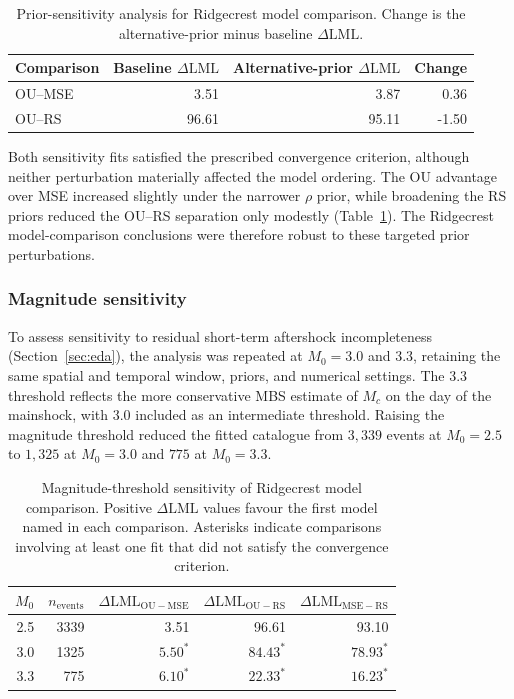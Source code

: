 \documentclass{statsmsc}
\begin{document}
\begin{table}[htbp]
\centering
\caption{Prior-sensitivity analysis for Ridgecrest model comparison. Change is the alternative-prior minus baseline $\Delta\mathrm{LML}$.}
\label{tab:ridgecrest-prior-sensitivity}
\begin{tabular}{lrrr}
\hline
Comparison & Baseline $\Delta\mathrm{LML}$ & Alternative-prior $\Delta\mathrm{LML}$ & Change \\
\hline
OU--MSE & 3.51 & 3.87 & 0.36 \\
OU--RS  & 96.61 & 95.11 & -1.50 \\
\hline
\end{tabular}
\end{table}

Both sensitivity fits satisfied the prescribed convergence criterion, although neither perturbation materially affected the model ordering. The OU advantage over MSE increased slightly under the narrower $\rho$ prior, while broadening the RS priors reduced the OU--RS separation only modestly (Table~\ref{tab:ridgecrest-prior-sensitivity}). The Ridgecrest model-comparison conclusions were therefore robust to these targeted prior perturbations.

\subsubsection{Magnitude sensitivity} \label{sec:mag-sensitivity}
To assess sensitivity to residual short-term aftershock incompleteness (Section~\ref{sec:eda}), the analysis was repeated at $M_0 = 3.0$ and $3.3$, retaining the same spatial and temporal window, priors, and numerical settings. The $3.3$ threshold reflects the more conservative MBS estimate of $M_c$ on the day of the mainshock, with $3.0$ included as an intermediate threshold. Raising the magnitude threshold reduced the fitted catalogue from $3{,}339$ events at $M_0 = 2.5$ to $1{,}325$ at $M_0 = 3.0$ and $775$ at $M_0=3.3$. 

\begin{table}[htbp]
\centering
\caption{Magnitude-threshold sensitivity of Ridgecrest model comparison. Positive $\Delta\mathrm{LML}$ values favour the first model named in each comparison. Asterisks indicate comparisons involving at least one fit that did not satisfy the convergence criterion.}
\label{tab:ridgecrest-m0-sensitivity}
\begin{tabular}{rrrrr}
\hline
$M_0$ & $n_{\mathrm{events}}$ & $\Delta\mathrm{LML}_{\mathrm{OU-MSE}}$
& $\Delta\mathrm{LML}_{\mathrm{OU-RS}}$
& $\Delta\mathrm{LML}_{\mathrm{MSE-RS}}$ \\
\hline
2.5 & 3339 & 3.51 & 96.61 & 93.10 \\
3.0 & 1325 & $5.50^\ast $& $84.43^\ast$ & $78.93^\ast$ \\
3.3 &  775 & $6.10^\ast$ & $22.33^\ast$ & $16.23^\ast$ \\
\hline
\end{tabular}
\end{table}
\end{document}
